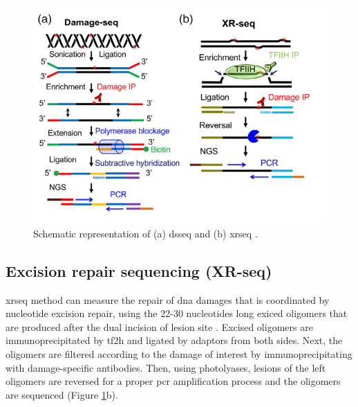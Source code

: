 \shorthandoff{=}
\begin{figure}[H]
    \begin{center}
    \includegraphics[width=\textwidth]{Chapters/1_introduction/figures/dsxrseq}
    \caption{Schematic representation of (a) \gls{dsseq} and (b) \gls{xrseq} \citep{li2020methodologies}.}
    \label{fig:dsxrseq}
    \end{center}
    \end{figure}

\subsection{Excision repair sequencing (XR-seq)}

\gls{xrseq} method can measure the repair of \gls{dna} damages that is coordinated by nucleotide excision repair, using the 22-30 nucleotides long exiced oligomers that are produced after the dual incision of lesion site \citep{hu2019genome,hu2016cisplatin}. Excised oligomers are immunoprecipitated by \gls{tf2h} and ligated by adaptors from both sides. Next, the oligomers are filtered according to the damage of interest by immunoprecipitating with damage-specific antibodies. Then, using photolyases, lesions of the left oligomers are reversed for a proper \gls{pcr} amplification process and the oligomers are sequenced (Figure \ref{fig:dsxrseq}b).
